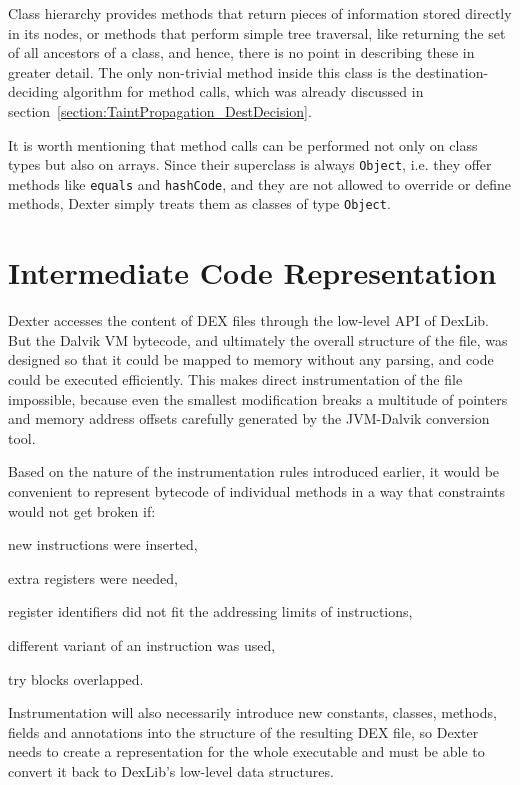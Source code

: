 \documentclass[12pt,twoside,notitlepage]{report}
\begin{document}
Class hierarchy provides methods that return pieces of information stored directly in its nodes, or methods that perform simple tree traversal, like returning the set of all ancestors of a class, and hence, there is no point in describing these in greater detail. The only non-trivial method inside this class is the destination-deciding algorithm for method calls, which was already discussed in section~\ref{section:TaintPropagation_DestDecision}. 

It is worth mentioning that method calls can be performed not only on class types but also on arrays. Since their superclass is always \verb$Object$, i.e. they offer methods like \verb$equals$ and \verb$hashCode$, and they are not allowed to override or define methods, Dexter simply treats them as classes of type \verb$Object$. 

\section{Intermediate Code Representation}

Dexter accesses the content of DEX files through the low-level API of DexLib. But the Dalvik VM bytecode, and ultimately the overall structure of the file, was designed so that it could be mapped to memory without any parsing, and code could be executed efficiently. This makes direct instrumentation of the file impossible, because even the smallest modification breaks a multitude of pointers and memory address offsets carefully generated by the JVM-Dalvik conversion tool.

Based on the nature of the instrumentation rules introduced earlier, it would be convenient to represent bytecode of individual methods in a way that constraints would not get broken if:
\begin{inparaenum}[(i)]
\item new instructions were inserted,
\item extra registers were needed,
\item register identifiers did not fit the addressing limits of instructions,
\item different variant of an instruction was used,
\item try blocks overlapped.
\end{inparaenum}
Instrumentation will also necessarily introduce new constants, classes, methods, fields and annotations into the structure of the resulting DEX file, so Dexter needs to create a representation for the whole executable and must be able to convert it back to DexLib's low-level data structures.
\end{document}
